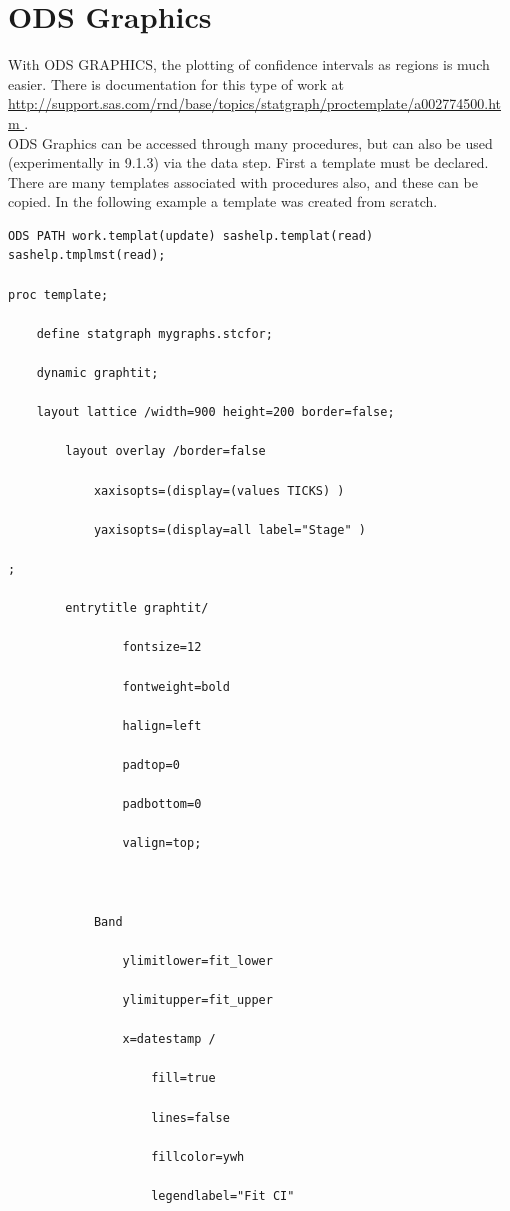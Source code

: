 \documentclass[10pt]{sugconf-ish}
\begin{document}
\section{ODS Graphics}
With ODS GRAPHICS, the plotting of confidence intervals as regions is much easier.
There is documentation for this type of work at \url{http://support.sas.com/rnd/base/topics/statgraph/proctemplate/a002774500.htm
} .\\
ODS Graphics can be accessed through many procedures, but can also be used (experimentally in 9.1.3) via the data step.  First a template must be declared.  There are many templates associated with procedures also, and these can be copied.  In the following example a template was created from scratch.
\scriptsize
\begin{verbatim}
ODS PATH work.templat(update) sashelp.templat(read) sashelp.tmplmst(read);

proc template;

    define statgraph mygraphs.stcfor;

    dynamic graphtit;

    layout lattice /width=900 height=200 border=false;

        layout overlay /border=false    

            xaxisopts=(display=(values TICKS) )

            yaxisopts=(display=all label="Stage" ) 

;

        entrytitle graphtit/

                fontsize=12

                fontweight=bold

                halign=left

                padtop=0

                padbottom=0

                valign=top;



            Band

                ylimitlower=fit_lower

                ylimitupper=fit_upper

                x=datestamp / 

                    fill=true 

                    lines=false 

                    fillcolor=ywh

                    legendlabel="Fit CI" 


\end{verbatim}
\end{document}
